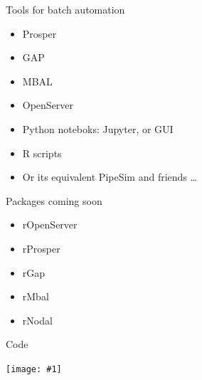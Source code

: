 \documentclass[14pt,ignorenonframetext,]{beamer}
\providecommand{\tightlist}{%
  \setlength{\itemsep}{0pt}\setlength{\parskip}{0pt}}
\def\fullwidth#1{\vspace*{-0.2cm}\par\centerline{\texttt{[image: \#1]}}}
\begin{document}
\begin{frame}{Tools for batch automation}
\protect\hypertarget{tools-for-batch-automation-1}{}

\begin{itemize}
\tightlist
\item
  Prosper
\item
  GAP
\item
  MBAL
\item
  OpenServer
\item
  Python noteboks: Jupyter, or GUI
\item
  R scripts
\item
  Or its equivalent PipeSim and friends \ldots{}
\end{itemize}

\end{frame}

\begin{frame}{Packages coming soon}
\protect\hypertarget{packages-coming-soon}{}

\begin{itemize}
\tightlist
\item
  rOpenServer
\item
  rProsper
\item
  rGap
\item
  rMbal
\item
  rNodal
\end{itemize}

\end{frame}

\begin{frame}{Code}
\protect\hypertarget{code}{}

\fullwidth{well_scanner_script}

\end{frame}
\end{document}
